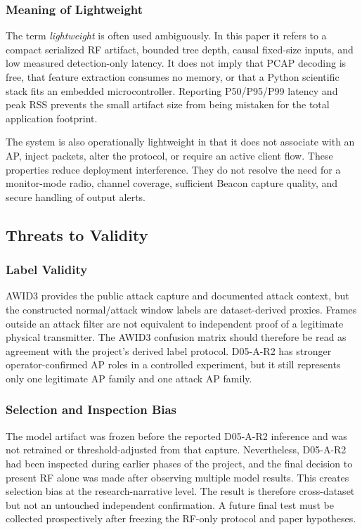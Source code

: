 \documentclass[conference]{IEEEtran}
\begin{document}
\subsubsection{Meaning of Lightweight}

The term \emph{lightweight} is often used ambiguously. In this paper it refers to a compact serialized RF artifact, bounded tree depth, causal fixed-size inputs, and low measured detection-only latency. It does not imply that PCAP decoding is free, that feature extraction consumes no memory, or that a Python scientific stack fits an embedded microcontroller. Reporting P50/P95/P99 latency and peak RSS prevents the small artifact size from being mistaken for the total application footprint.

The system is also operationally lightweight in that it does not associate with an AP, inject packets, alter the protocol, or require an active client flow. These properties reduce deployment interference. They do not resolve the need for a monitor-mode radio, channel coverage, sufficient Beacon capture quality, and secure handling of output alerts.

\subsection{Threats to Validity}

\subsubsection{Label Validity}

AWID3 provides the public attack capture and documented attack context, but the constructed normal/attack window labels are dataset-derived proxies. Frames outside an attack filter are not equivalent to independent proof of a legitimate physical transmitter. The AWID3 confusion matrix should therefore be read as agreement with the project's derived label protocol. D05-A-R2 has stronger operator-confirmed AP roles in a controlled experiment, but it still represents only one legitimate AP family and one attack AP family.

\subsubsection{Selection and Inspection Bias}

The model artifact was frozen before the reported D05-A-R2 inference and was not retrained or threshold-adjusted from that capture. Nevertheless, D05-A-R2 had been inspected during earlier phases of the project, and the final decision to present RF alone was made after observing multiple model results. This creates selection bias at the research-narrative level. The result is therefore cross-dataset but not an untouched independent confirmation. A future final test must be collected prospectively after freezing the RF-only protocol and paper hypotheses.
\end{document}
